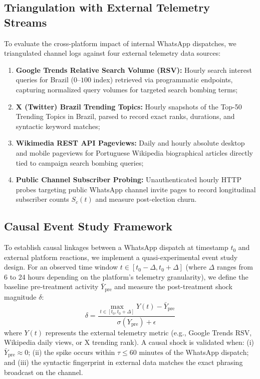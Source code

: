 \documentclass[preprint,12pt]{elsarticle}
\begin{document}
\subsection{Triangulation with External Telemetry Streams}
To evaluate the cross-platform impact of internal WhatsApp dispatches, we triangulated channel logs against four external telemetry data sources:
\begin{enumerate}
    \item \textbf{Google Trends Relative Search Volume (RSV):} Hourly search interest queries for Brazil ($0$--$100$ index) retrieved via programmatic endpoints, capturing normalized query volumes for targeted search bombing terms;
    \item \textbf{X (Twitter) Brazil Trending Topics:} Hourly snapshots of the Top-50 Trending Topics in Brazil, parsed to record exact ranks, durations, and syntactic keyword matches;
    \item \textbf{Wikimedia REST API Pageviews:} Daily and hourly absolute desktop and mobile pageviews for Portuguese Wikipedia biographical articles directly tied to campaign search bombing queries;
    \item \textbf{Public Channel Subscriber Probing:} Unauthenticated hourly HTTP probes targeting public WhatsApp channel invite pages to record longitudinal subscriber counts $S_c(t)$ and measure post-election churn.
\end{enumerate}

\subsection{Causal Event Study Framework}
To establish causal linkages between a WhatsApp dispatch at timestamp $t_0$ and external platform reactions, we implement a quasi-experimental event study design. For an observed time window $t \in [t_0 - \Delta, t_0 + \Delta]$ (where $\Delta$ ranges from 6 to 24 hours depending on the platform's telemetry granularity), we define the baseline pre-treatment activity $\bar{Y}_{\text{pre}}$ and measure the post-treatment shock magnitude $\delta$:
\begin{equation}
\delta = \frac{\max_{t \in [t_0, t_0 + \Delta]} Y(t) - \bar{Y}_{\text{pre}}}{\sigma(Y_{\text{pre}}) + \epsilon}
\end{equation}
where $Y(t)$ represents the external telemetry metric (e.g., Google Trends RSV, Wikipedia daily views, or X trending rank). A causal shock is validated when: (i) $\bar{Y}_{\text{pre}} \approx 0$; (ii) the spike occurs within $\tau \le 60\text{ minutes}$ of the WhatsApp dispatch; and (iii) the syntactic fingerprint in external data matches the exact phrasing broadcast on the channel.
\end{document}
